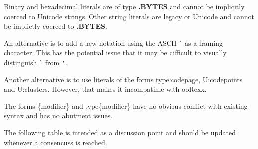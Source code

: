 \documentclass[b4paper]{article}
\begin{document}
Binary and hexadecimal literals are of type \textbf{.BYTES} and cannot be implicitly coerced to Unicode strings.
Other string literals are legacy or Unicode and cannot be implictly coerced to \textbf{.BYTES}.

An alternative is to add a new notation using the ASCII \verb|`| as a
framing character. This has the potential issue that it may be
difficult to visually distinguish  \verb|`| from  \verb|'|.

Another alternative is to use literals of the forms
{\textquotesingle}\textellipsis{\textquotesingle}type:codepage,
{\textquotesingle}\textellipsis{\textquotesingle}U:codepoints and
{\textquotesingle}\textellipsis{\textquotesingle}U:clusters. However,
that makes it incompatinle with ooRexx.

The forms {\textquotesingle}\textellipsis{\textquotesingle}\{modifier\} and
{\textquotesingle}\textellipsis{\textquotesingle}type\{modifier\}
have no obvious conflict with existing syntax and has no abutment issues.

The following table is intended as a discussion point and should be updated whenever a consencuss is reached.
\end{document}

